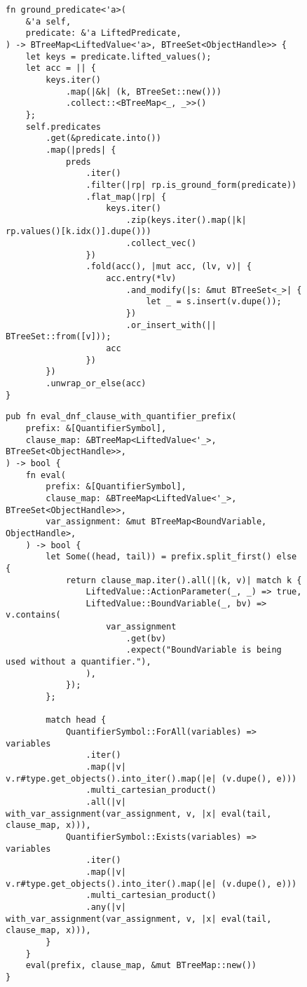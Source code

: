 \documentclass{article}
\begin{document}
\begin{figure}
  \begin{verbatim}
fn ground_predicate<'a>(
    &'a self,
    predicate: &'a LiftedPredicate,
) -> BTreeMap<LiftedValue<'a>, BTreeSet<ObjectHandle>> {
    let keys = predicate.lifted_values();
    let acc = || {
        keys.iter()
            .map(|&k| (k, BTreeSet::new()))
            .collect::<BTreeMap<_, _>>()
    };
    self.predicates
        .get(&predicate.into())
        .map(|preds| {
            preds
                .iter()
                .filter(|rp| rp.is_ground_form(predicate))
                .flat_map(|rp| {
                    keys.iter()
                        .zip(keys.iter().map(|k| rp.values()[k.idx()].dupe()))
                        .collect_vec()
                })
                .fold(acc(), |mut acc, (lv, v)| {
                    acc.entry(*lv)
                        .and_modify(|s: &mut BTreeSet<_>| {
                            let _ = s.insert(v.dupe());
                        })
                        .or_insert_with(|| BTreeSet::from([v]));
                    acc
                })
        })
        .unwrap_or_else(acc)
}
  \end{verbatim}
  \label{code:groundpredicate}
\end{figure}


\begin{figure}
  \begin{verbatim}
pub fn eval_dnf_clause_with_quantifier_prefix(
    prefix: &[QuantifierSymbol],
    clause_map: &BTreeMap<LiftedValue<'_>, BTreeSet<ObjectHandle>>,
) -> bool {
    fn eval(
        prefix: &[QuantifierSymbol],
        clause_map: &BTreeMap<LiftedValue<'_>, BTreeSet<ObjectHandle>>,
        var_assignment: &mut BTreeMap<BoundVariable, ObjectHandle>,
    ) -> bool {
        let Some((head, tail)) = prefix.split_first() else {
            return clause_map.iter().all(|(k, v)| match k {
                LiftedValue::ActionParameter(_, _) => true,
                LiftedValue::BoundVariable(_, bv) => v.contains(
                    var_assignment
                        .get(bv)
                        .expect("BoundVariable is being used without a quantifier."),
                ),
            });
        };

        match head {
            QuantifierSymbol::ForAll(variables) => variables
                .iter()
                .map(|v| v.r#type.get_objects().into_iter().map(|e| (v.dupe(), e)))
                .multi_cartesian_product()
                .all(|v| with_var_assignment(var_assignment, v, |x| eval(tail, clause_map, x))),
            QuantifierSymbol::Exists(variables) => variables
                .iter()
                .map(|v| v.r#type.get_objects().into_iter().map(|e| (v.dupe(), e)))
                .multi_cartesian_product()
                .any(|v| with_var_assignment(var_assignment, v, |x| eval(tail, clause_map, x))),
        }
    }
    eval(prefix, clause_map, &mut BTreeMap::new())
}
  \end{verbatim}
  \label{code:evalprefix}
\end{figure}
\end{document}
